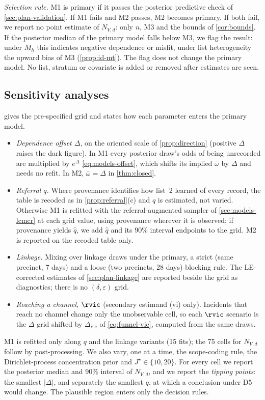 \emph{Selection rule.} M1 is primary if it passes the posterior predictive check of \cref{sec:plan-validation}. If M1 fails and M2 passes, M2 becomes primary. If both fail, we report no point estimate of $N_{V,d}$: only $n$, M3 and the bounds of \cref{cor:bounds}. If the posterior median of the primary model falls below M3, we flag the result: under $M_h$ this indicates negative dependence or misfit, under list heterogeneity the upward bias of M3 (\cref{prop:id-mt}). The flag does not change the primary model. No list, stratum or covariate is added or removed after estimates are seen.

\subsection{Sensitivity analyses}\label{sec:plan-sensitivity}

 gives the pre-specified grid and states how each parameter enters the primary model.
\begin{itemize}
  \item \emph{Dependence offset $\Delta$}, on the oriented scale of \cref{prop:direction} (positive $\Delta$ raises the dark figure). In M1 every posterior draw's odds of being unrecorded are multiplied by $e^{\Delta}$ \eqref{eq:models-offset}, which shifts its implied $\bar\omega$ by $\Delta$ and needs no refit. In M2, $\bar\omega=\Delta$ in \cref{thm:closed}.
  \item \emph{Referral $q$.} Where provenance identifies how list~2 learned of every record, the table is recoded as in \cref{prop:referral}(c) and $q$ is estimated, not varied. Otherwise M1 is refitted with the referral-augmented sampler of \cref{sec:models-lcmcr} at each grid value, using provenance wherever it is observed; if provenance yields $\hat q$, we add $\hat q$ and its 90\% interval endpoints to the grid. M2 is reported on the recoded table only.
  \item \emph{Linkage.} Mixing over linkage draws under the primary, a strict (same precinct, 7 days) and a loose (two precincts, 28 days) blocking rule. The LE-corrected estimates of \cref{sec:plan-linkage} are reported beside the grid as diagnostics; there is no $(\delta,\varepsilon)$ grid.
  \item \emph{Reaching a channel, $\rvic$} (secondary estimand (vi) only). Incidents that reach no channel change only the unobservable cell, so each $\rvic$ scenario is the $\Delta$ grid shifted by $\Delta_{\mathrm{vic}}$ of \eqref{eq:funnel-vic}, computed from the same draws.
\end{itemize}
M1 is refitted only along $q$ and the linkage variants (15 fits); the 75 cells for $N_{V,d}$ follow by post-processing. We also vary, one at a time, the scope-coding rule, the Dirichlet-process concentration prior and $J^\star\in\{10,20\}$. For every cell we report the posterior median and 90\% interval of $N_{V,d}$, and we report the \emph{tipping points}: the smallest $|\Delta|$, and separately the smallest $q$, at which a conclusion under D5 would change. The plausible region enters only the decision rules.

